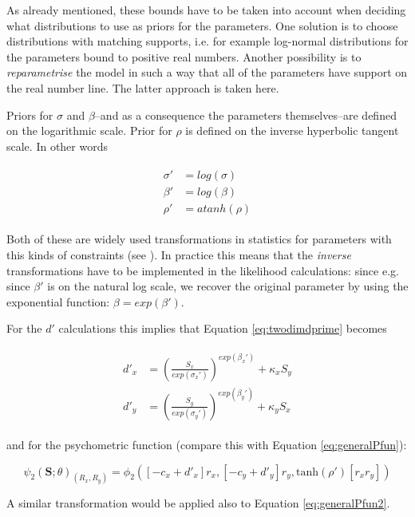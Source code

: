 \documentclass{article}\usepackage{knitr}
\begin{document}
As already mentioned, these bounds have to be taken into account when deciding what distributions to use as priors for the parameters. One solution is to choose distributions with matching supports, i.e. for example log-normal distributions for the parameters bound to positive real numbers. Another possibility is to \textit{reparametrise} the model in such a way that all of the parameters have support on the real number line. The latter approach is taken here. 

Priors for $\sigma$ and $\beta$--and as a consequence the parameters themselves--are defined on the logarithmic scale. Prior for $\rho$ is defined on the inverse hyperbolic tangent scale. In other words

\begin{align}
	\begin{split}
		\sigma' &= log(\sigma) \\
		\beta' &= log(\beta)   \\
		\rho' &= atanh(\rho)
	\end{split}
\end{align}


Both of these are widely used transformations in statistics for parameters with this kinds of constraints (see \citet[Chapter 22]{stan_manual}). In practice this means that the \textit{inverse} transformations have to be implemented in the likelihood calculations: since e.g. since $\beta'$ is on the natural log scale, we recover the original parameter by using the exponential function: $\beta = exp(\beta')$. 

For the $d'$ calculations this implies that Equation \ref{eq:twodimdprime} becomes

\begin{align}
\begin{split}
d'_x &= (\frac{S_x}{exp(\sigma_{x}')})^{exp(\beta_{x}')} + \kappa_x S_y \\
d'_y &= (\frac{S_y}{exp(\sigma_{y}')})^{exp(\beta_{y}')} + \kappa_y S_x
\end{split}
\end{align}

and for the psychometric function (compare this with Equation \ref{eq:generalPfun}):

\begin{equation}
\psi_2(\bm{S}; \theta)_{(R_x, R_y)} = \phi_2([-c_x + d'_x]r_x, [-c_y + d'_y] r_y, \text{tanh}(\rho') [r_x r_y])
\end{equation}

A similar transformation would be applied also to Equation \ref{eq:generalPfun2}.
\end{document}
